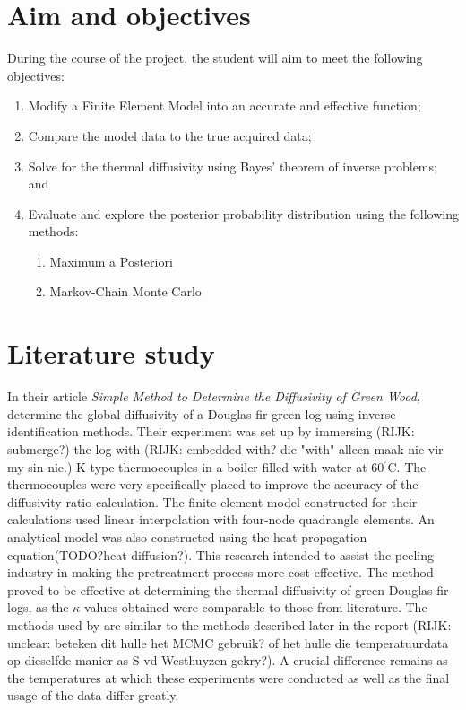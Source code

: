 \section{Aim and objectives}
During the course of the project, the student will aim to meet the following objectives:
\begin{enumerate}
 \item Modify a Finite Element Model into an accurate and effective function;
 \item Compare the model data to the true acquired data;
 \item Solve for the thermal diffusivity using Bayes' theorem of inverse problems; and
 \item Evaluate and explore the posterior probability distribution using the following methods:
 	\begin{enumerate}
 		\item Maximum a Posteriori
 		\item Markov-Chain Monte Carlo 	
 	\end{enumerate}
\end{enumerate}

\section{Literature study}\label{litstudy}
	
	In their article \textit{Simple Method to Determine the Diffusivity of Green Wood}, \citeauthor{bioresource:2020}  determine the global diffusivity of a Douglas fir green log using inverse identification methods. 
	Their experiment was set up by immersing (RIJK: submerge?) the log with (RIJK: embedded with? die "with" alleen maak nie vir my sin nie.) K-type thermocouples in a boiler filled with water at 60$^{^{\circ}}$C. 
	The thermocouples were very specifically placed to improve the accuracy of the diffusivity ratio calculation.
	The finite element model constructed for their calculations used linear interpolation with four-node quadrangle elements.
	An analytical model was also constructed using the heat propagation equation(TODO?heat diffusion?).
	This research intended to assist the peeling industry in making the pretreatment process more cost-effective.
	The method proved to be effective at determining the thermal diffusivity of green Douglas fir logs, as the $\kappa$-values obtained were comparable to those from literature.
	The methods used by \citet{bioresource:2020} are similar to the methods described later in the report (RIJK: unclear:  beteken dit hulle het MCMC gebruik? of het hulle die temperatuurdata op dieselfde manier as S vd Westhuyzen gekry?).
	A crucial difference remains as the temperatures at which these experiments were conducted as well as the final usage of the data differ greatly.

